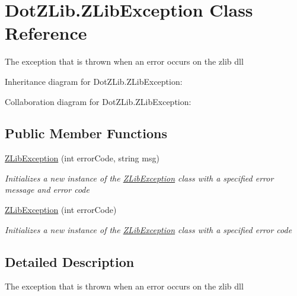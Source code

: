 \hypertarget{class_dot_z_lib_1_1_z_lib_exception}{\section{Dot\+Z\+Lib.\+Z\+Lib\+Exception Class Reference}
\label{class_dot_z_lib_1_1_z_lib_exception}
}


The exception that is thrown when an error occurs on the zlib dll  




Inheritance diagram for Dot\+Z\+Lib.\+Z\+Lib\+Exception\+:


Collaboration diagram for Dot\+Z\+Lib.\+Z\+Lib\+Exception\+:
\subsection*{Public Member Functions}
\begin{DoxyCompactItemize}
\item 
\hyperlink{class_dot_z_lib_1_1_z_lib_exception_a6a413e419130b98ef8a443a74b2f8ded}{Z\+Lib\+Exception} (int error\+Code, string msg)
\begin{DoxyCompactList}\small\item\em Initializes a new instance of the \hyperlink{class_dot_z_lib_1_1_z_lib_exception}{Z\+Lib\+Exception} class with a specified error message and error code \end{DoxyCompactList}\item 
\hyperlink{class_dot_z_lib_1_1_z_lib_exception_af8dd9c725ef7bd7b2d2042e827ce9fb7}{Z\+Lib\+Exception} (int error\+Code)
\begin{DoxyCompactList}\small\item\em Initializes a new instance of the \hyperlink{class_dot_z_lib_1_1_z_lib_exception}{Z\+Lib\+Exception} class with a specified error code \end{DoxyCompactList}\end{DoxyCompactItemize}


\subsection{Detailed Description}
The exception that is thrown when an error occurs on the zlib dll 



